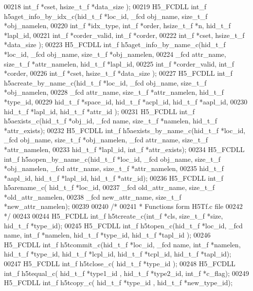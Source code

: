 \begin{DoxyCode}
00218                    int\_f *cset, hsize\_t\_f *data\_size );
00219 H5\_FCDLL int\_f h5aget\_info\_by\_idx\_c(hid\_t\_f *loc\_id, \_fcd obj\_name, size\_t\_f *obj\_namelen,
00220                       int\_f *idx\_type, int\_f *order, hsize\_t\_f *n, hid\_t\_f *lapl\_id,
00221                       int\_f *corder\_valid, int\_f *corder,
00222                       int\_f *cset, hsize\_t\_f *data\_size );
00223 H5\_FCDLL int\_f h5aget\_info\_by\_name\_c(hid\_t\_f *loc\_id, \_fcd obj\_name, size\_t\_f *obj\_namelen,
00224                        \_fcd attr\_name, size\_t\_f *attr\_namelen, hid\_t\_f *lapl\_id,
00225                        int\_f *corder\_valid, int\_f *corder,
00226                        int\_f *cset, hsize\_t\_f *data\_size );
00227 H5\_FCDLL int\_f h5acreate\_by\_name\_c(hid\_t\_f *loc\_id, \_fcd obj\_name, size\_t\_f *obj\_namelen,
00228                     \_fcd attr\_name, size\_t\_f *attr\_namelen,  hid\_t\_f *type\_id,
00229                     hid\_t\_f *space\_id, hid\_t\_f *acpl\_id, hid\_t\_f *aapl\_id,
00230                     hid\_t\_f *lapl\_id, hid\_t\_f *attr\_id );
00231 H5\_FCDLL int\_f h5aexists\_c(hid\_t\_f *obj\_id, \_fcd name, size\_t\_f *namelen, hid\_t\_f *attr\_exists);
00232 H5\_FCDLL int\_f h5aexists\_by\_name\_c(hid\_t\_f *loc\_id, \_fcd obj\_name, size\_t\_f *obj\_namelen, \_fcd attr\_name, 
      size\_t\_f *attr\_namelen,
00233               hid\_t\_f *lapl\_id, int\_f *attr\_exists);
00234 H5\_FCDLL int\_f h5aopen\_by\_name\_c(hid\_t\_f *loc\_id, \_fcd obj\_name, size\_t\_f *obj\_namelen, \_fcd attr\_name, 
      size\_t\_f *attr\_namelen,
00235                    hid\_t\_f *aapl\_id, hid\_t\_f *lapl\_id, hid\_t\_f *attr\_id);
00236 H5\_FCDLL int\_f h5arename\_c( hid\_t\_f *loc\_id,
00237               \_fcd old\_attr\_name, size\_t\_f *old\_attr\_namelen,
00238               \_fcd new\_attr\_name, size\_t\_f *new\_attr\_namelen);
00239 
00240 \textcolor{comment}{/*}
00241 \textcolor{comment}{ * Functions form H5Tf.c file}
00242 \textcolor{comment}{ */}
00243 
00244 H5\_FCDLL int\_f h5tcreate\_c(int\_f *cls, size\_t\_f *size, hid\_t\_f *type\_id);
00245 H5\_FCDLL int\_f h5topen\_c(hid\_t\_f *loc\_id, \_fcd name, int\_f *namelen, hid\_t\_f *type\_id, hid\_t\_f *tapl\_id );
00246 H5\_FCDLL int\_f h5tcommit\_c(hid\_t\_f *loc\_id, \_fcd name, int\_f *namelen, hid\_t\_f *type\_id, hid\_t\_f *lcpl\_id, 
      hid\_t\_f *tcpl\_id, hid\_t\_f *tapl\_id);
00247 H5\_FCDLL int\_f h5tclose\_c( hid\_t\_f *type\_id );
00248 H5\_FCDLL int\_f h5tequal\_c( hid\_t\_f *type1\_id , hid\_t\_f *type2\_id, int\_f *c\_flag);
00249 H5\_FCDLL int\_f h5tcopy\_c( hid\_t\_f *type\_id , hid\_t\_f *new\_type\_id);

\end{DoxyCode}
